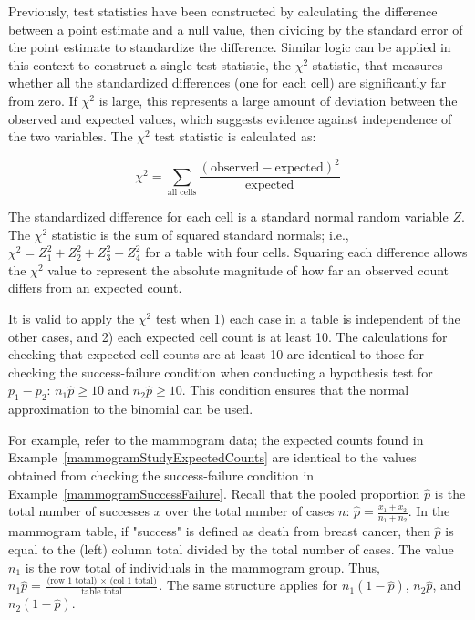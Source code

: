 Previously, test statistics have been constructed by calculating the difference between a point estimate and a null value, then dividing by the standard error of the point estimate to standardize the difference. Similar logic can be applied in this context to construct a single test statistic, the $\chi^2$ statistic, that measures whether all the standardized differences (one for each cell) are significantly far from zero. If $\chi^2$ is large, this represents a large amount of deviation between the observed and expected values, which suggests evidence against independence of the two variables. The $\chi^2$ test statistic is calculated as:

\[\chi^2 = \sum_{\text{all cells}} \frac{(\text{observed} - \text{expected})^2}{\text{expected}} \]

The standardized difference for each cell is a standard normal random variable $Z$. The $\chi^2$ statistic is the sum of squared standard normals; i.e., $\chi^2 = Z_1^2 + Z_2^2 + Z_3^2 + Z_4^2$ for a table with four cells. Squaring each difference allows the $\chi^2$ value to represent the absolute magnitude of how far an observed count differs from an expected count.

It is valid to apply the $\chi^2$ test when 1) each case in a table is independent of the other cases, and 2) each expected cell count is at least 10. The calculations for checking that expected cell counts are at least 10 are identical to those for checking the success-failure condition when conducting a hypothesis test for $p_1 - p_2$:  $n_1 \hat{p} \geq 10$ and $n_2 \hat{p} \geq 10$. This condition ensures that the normal approximation to the binomial can be used.

For example, refer to the mammogram data; the expected counts found in Example~\ref{mammogramStudyExpectedCounts} are identical to the values obtained from checking the success-failure condition in Example~\ref{mammogramSuccessFailure}. Recall that the pooled proportion $\hat{p}$ is the total number of successes $x$ over the total number of cases $n$: $\hat{p} = \frac{x_1 + x_2}{n_1 + n_2}$. In the mammogram table, if "success" is defined as death from breast cancer, then $\hat{p}$ is equal to the (left) column total divided by the total number of cases. The value $n_1$ is the row total of individuals in the mammogram group. Thus, $n_1 \hat{p}  = \frac{\text{(row 1 total) } \times \text{ (col 1 total)}}{\text{table total}}$. The same structure applies for $n_1 (1 - \hat{p})$, $n_2 \hat{p}$, and $n_2 (1 - \hat{p})$.

